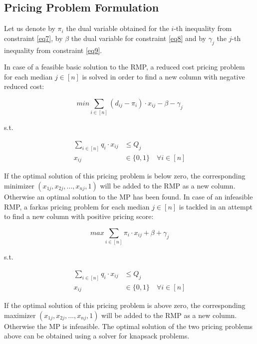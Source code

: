 \documentclass[
	11pt,
	DIV10,
	ngerman,
	a4paper,
	oneside,
	headings=normal,
	captions=tableheading,
	final,
	numbers=noenddot
]{scrartcl}
\begin{document}
\subsection{Pricing Problem Formulation}

Let us denote by $ \pi_{i} $ the dual variable obtained for the $ i $-th inequality from constraint \eqref{eq7}, by $ \beta $ the dual variable for constraint \eqref{eq8} and by $ \gamma_{j} $ the $ j $-th inequality from constraint \eqref{eq9}.

In case of a feasible basic solution to the RMP, a reduced cost pricing problem for each median $ j \in [n]$ is solved in order to find a new column with negative reduced cost:

\begin{equation}
	min \sum_{i \in [n]} (d_{ij} - \pi_{i}) \cdot x_{ij} - \beta - \gamma_{j}
\end{equation}

s.t.

\begin{align}
	\sum_{i \in [n]} q_{i} \cdot x_{ij} &\leq Q_{j} \\[1em]
	x_{ij} &\in \{0, 1\} \quad \forall i \in [n] \nonumber
\end{align}

If the optimal solution of this pricing problem is below zero, the corresponding minimizer $ (x_{1j}, x_{2j}, ..., x_{nj}, 1) $ will be added to the RMP as a new column. Otherwise an optimal solution to the MP has been found. In case of an infeasible RMP, a farkas pricing problem for each median $ j \in [n]$ is tackled in an attempt to find a new column with positive pricing score:

\begin{equation}
	max \sum_{i \in [n]} \pi_{i} \cdot x_{ij} + \beta + \gamma_{j}
\end{equation}

s.t.

\begin{align}
	\sum_{i \in [n]} q_{i} \cdot x_{ij} &\leq Q_{j} \\[1em]
	x_{ij} &\in \{0, 1\} \quad \forall i \in [n] \nonumber
\end{align}

If the optimal solution of this pricing problem is above zero, the corresponding maximizer $ (x_{1j}, x_{2j}, ..., x_{nj}, 1) $ will be added to the RMP as a new column. Otherwise the MP is infeasible. The optimal solution of the two pricing problems above can be obtained using a solver for knapsack problems.
\end{document}
